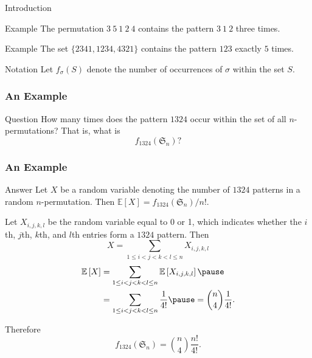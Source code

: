 \documentclass[xcolor=dvipsnames]{beamer}
\newcommand{\num}{f}
\newcommand{\si}{\sigma}
\renewcommand{\S}{\mathfrak{S}}
\newcommand{\Ex}[1]{\mathbb{E}\left[ #1 \right]}
\begin{document}
\begin{frame} 
  \begin{center}
    \rmfamily \LARGE \color{teal}{Counting Patterns}
  \end{center}
\end{frame}
    

\begin{frame}{Introduction}
  \pause 

  \begin{block}{Example}
    The permutation $3 \ 5 \ 1 \ 2 \ 4$ contains the
    pattern $3 \ 1 \ 2$ three times.
  \end{block}
  \pause

  \begin{block}{Example}
    The set $\{ 2341 , 1234, 4321 \} $ contains the pattern $123$
    exactly $5$ times. 
  \end{block}

  \pause

  \begin{block}{Notation}
    Let $\num_\si (S)$ denote the number of occurrences of $\si$ within the
    set $S$. 
  \end{block}
\end{frame}

\begin{frame} \frametitle{An Example}

  \begin{block}{Question}
    How many times does the pattern $1324$ occur within the set of all
    $n$-permutations? That is, what is 
    $$\num_{1324} (\S_n)?$$
  \end{block}
\end{frame}

\begin{frame} \frametitle{An Example}

  \begin{block}{Answer}
  Let $X$ be a random variable denoting the number of $1324$ patterns in a
  random $n$-permutation. Then $\Ex{X} = \num_{1324}(\S_n) / n!$. 
  
  \pause
  
  Let $X_{i,j,k,l}$ be the random variable equal to 0 or 1, which indicates
  whether the $i$th, $j$th, $k$th, and $l$th entries form a $1324$ pattern.
  Then 
  $$ X = \sum_{1 \leq i < j < k < l \leq n} X_{i,j,k,l} $$
  \pause
  $$ \begin{aligned}
    \Ex{X} &= \sum_{1 \leq i < j < k < l \leq n} \Ex{X_{i,j,k,l}} \pause \\
       &= \sum_{1 \leq i < j < k < l \leq n} \frac{1}{4!} \pause 
       = \binom{n}{4} \frac{1}{4!}.
    \end{aligned} $$

  Therefore 
  $$\num_{1324}(\S_n) = \binom{n}{4} \frac{n!}{4!}.$$

  \end{block}

\end{frame}
\end{document}
